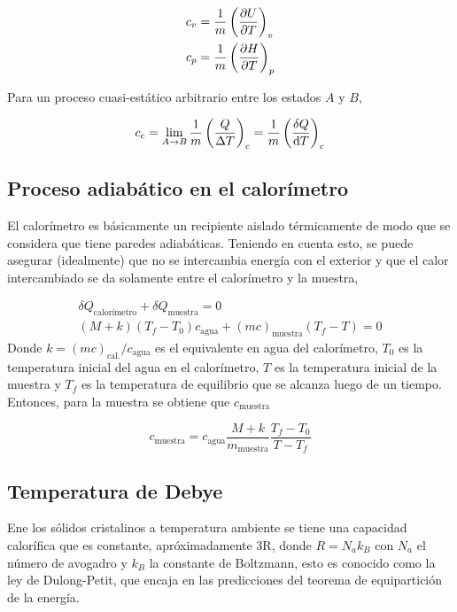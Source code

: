 \begin{align*}
    c_v &= \frac{1}{m}\left(\frac{\partial U}{\partial T}\right)_v \\
    c_p &= \frac{1}{m}\left(\frac{\partial H}{\partial T}\right)_p
\end{align*}

Para un proceso cuasi-estático arbitrario entre los estados $A$ y $B$,

\begin{equation}
    c_c = \lim_{A\to B} \frac{1}{m}\left(\frac{Q}{\Delta T}\right)_c =  \frac{1}{m}\left(\frac{\delta Q}{\text d T}\right)_c
\end{equation}

\subsection{Proceso adiabático en el calorímetro}

El calorímetro es básicamente un recipiente aislado térmicamente de modo que se considera que tiene paredes adiabáticas. Teniendo en cuenta esto, se puede asegurar (idealmente) que no se intercambia energía con el exterior y que el calor intercambiado se da solamente entre el calorímetro y la muestra,

\begin{align*}
    \delta Q_{\text{calorímetro}} + \delta Q_{\text{muestra}} = 0 \\
    \left(M+ k \right)(T_f-T_0)c_{\text{agua}} + (mc)_{\text{muestra}}(T_f-T) = 0
\end{align*}
Donde $k=(mc)_{\text{cal.}}/c_{\text{agua}}$ es el equivalente en agua del calorímetro, $T_0$ es la temperatura inicial del agua en el calorímetro, $T$ es la temperatura inicial de la muestra y $T_f$ es la temperatura de equilibrio que se alcanza luego de un tiempo. Entonces, para la muestra se obtiene que $c_{\text{muestra}}$

\begin{equation}
c_{\text{muestra}} = c_{\text{agua}}\dfrac{M + k}{m_{\text{muestra}}}\dfrac{T_f-T_0}{T-T_f}
\end{equation}
\subsection{Temperatura de Debye}

Ene los sólidos cristalinos a temperatura ambiente se tiene una capacidad calorífica que es constante, apróximadamente 3R, donde $R=N_ak_B$ con $N_a$ el número de avogadro y $k_B$ la constante de Boltzmann, esto es conocido como la ley de Dulong-Petit, que encaja en las predicciones del teorema de equipartición de la energía.

